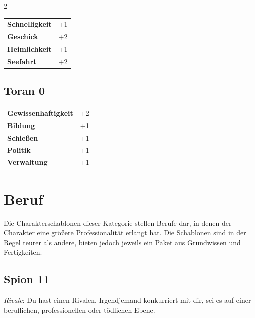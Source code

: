 \begin{multicols}{2}
\begin{tcolorbox}
\begin{tabular}{@{}ll@{}}
    \textbf{Schnelligkeit} & +1\\
    \textbf{Geschick} & +2\\
    \textbf{Heimlichkeit} & +1\\
    \textbf{Seefahrt} & +2\\
\end{tabular}


\end{tcolorbox}

\begin{tcolorbox}
    \subsection*{Toran \hfill \small{0 }}
    \tcblower




\begin{tabular}{@{}ll@{}}
    \textbf{Gewissenhaftigkeit} & +2\\
    \textbf{Bildung} & +1\\
    \textbf{Schießen} & +1\\
    \textbf{Politik} & +1\\
    \textbf{Verwaltung} & +1\\
\end{tabular}


\end{tcolorbox}

\section{Beruf}

Die Charakterschablonen dieser Kategorie stellen Berufe dar, in denen der Charakter eine größere Professionalität erlangt hat. Die Schablonen sind in der Regel teurer als andere, bieten jedoch jeweils ein Paket aus Grundwissen und Fertigkeiten.

\begin{tcolorbox}
    \subsection*{Spion \hfill \small{11 }}
    \tcblower
\textit{Rivale}: Du hast einen Rivalen. Irgendjemand konkurriert mit dir, sei es auf einer beruflichen, professionellen oder tödlichen Ebene.



\end{tcolorbox}
\end{multicols}
